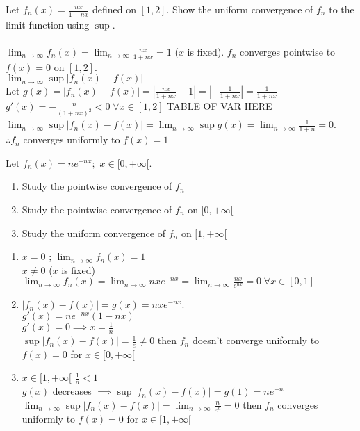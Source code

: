 \begin{example}
    Let $f_n(x)=\frac{nx}{1+nx}$ defined on $[1,2]$. Show the uniform convergence of $f_n$ to the limit function using $\sup$.\\\\
    $\lim_{n \to \infty} f_n(x)=\lim_{n \to \infty}\frac{nx}{1+nx}=1$ ($x$ is fixed). $f_n$ converges pointwise to $f(x)=0$ on $[1,2]$.\\
    $\lim_{n \to \infty}\sup \left| f_n(x)-f(x) \right|  $ \\
    Let $g(x)=\left| f_n(x)-f(x) \right|=\left| \frac{nx}{1+nx}-1 \right| = \left| -\frac{1}{1+nx} \right| =\frac{1}{1+nx}$ \\
    $g'(x)=-\frac{n}{(1+nx)^2}<0\; \forall x \in [1,2]$ TABLE OF VAR HERE\\
    $\lim_{n \to \infty}\sup \left| f_n(x)-f(x) \right| =\lim_{n \to \infty}\sup g(x)=\lim_{n \to \infty} \frac{1}{1+n}=0$.\\
    $\therefore f_n$ converges uniformly to $f(x)=1$
\end{example}

\begin{example}
   Let $f_n(x)=ne^{-nx}; $ $x\in[0,+ \infty[$.
   \begin{enumerate}
       \item Study the pointwise convergence of $f_n$ 
       \item Study the pointwise convergence of $f_n$ on $[0,+\infty[$
       \item Study the uniform convergence of $f_n$ on $[1,+\infty[$
   \end{enumerate}
   \vspace{\baselineskip}
    \begin{enumerate}
        \item $x=0$ ; $\lim_{n \to \infty}f_n(x)=1 $ \\
            $x\neq 0$ ($x$ is fixed)\\
        $\lim_{n \to \infty}f_n(x) = \lim_{n \to \infty}nxe^{-nx}=\lim_{n \to \infty}\frac{nx}{e^{nx}}=0\; \forall x\in[0,1]$
    \item $\left| f_n(x)-f(x) \right| =g(x)=nxe^{-nx}$.\\
        $g'(x)=ne^{-nx}(1-nx)$ \\
        $g'(x)=0\implies x=\frac{1}{n}$\\ %
        $\sup \left| f_n(x)-f(x) \right| =\frac{1}{e}\neq 0$ then $f_n$ doesn't converge uniformly to $f(x)=0$ for $x\in[0,+\infty[$ 
    \item $x\in[1,+\infty[$ $\frac{1}{n}<1$ \\
        $g(x)$ decreases $\implies \sup \left| f_n(x)-f(x) \right| =g(1)=ne^{-n}$\\
        $\lim_{n \to \infty}\sup \left| f_n(x)-f(x) \right| =\lim_{n \to \infty}\frac{n}{e^{n}}=0  $ then $f_n$ converges uniformly to $f(x)=0$ for $x\in[1,+\infty[$
    \end{enumerate}
\end{example}

